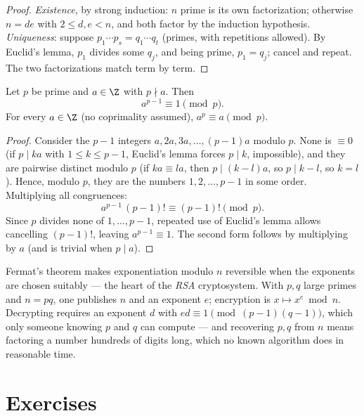 \begin{proof}
\emph{Existence}, by strong induction: $n$ prime is its own factorization;
otherwise $n = de$ with $2 \leq d, e < n$, and both factor by the induction
hypothesis. \emph{Uniqueness}: suppose
$p_1\cdots p_s = q_1 \cdots q_t$ (primes, with repetitions allowed). By
Euclid's lemma, $p_1$ divides some $q_j$, and being prime, $p_1 = q_j$;
cancel and repeat. The two factorizations match term by term.
\end{proof}

\begin{theorem}\label{thm:tle:arith:fermat}
Let $p$ be prime and $a \in \Z$ with $p \nmid a$. Then
\[
a^{p-1} \equiv 1 \pmod p .
\]
For every $a \in \Z$ (no coprimality assumed), $a^p \equiv a \pmod p$.
\end{theorem}

\begin{proof}
Consider the $p - 1$ integers $a, 2a, 3a, \dots, (p-1)a$ modulo $p$. None
is $\equiv 0$ (if $p \mid ka$ with $1 \leq k \leq p-1$, Euclid's lemma forces
$p \mid k$, impossible), and they are pairwise distinct modulo $p$ (if
$ka \equiv la$, then $p \mid (k - l)a$, so $p \mid k - l$, so $k = l$).
Hence, modulo $p$, they are the numbers $1, 2, \dots, p-1$ in some order.
Multiplying all congruences:
\[
a^{p-1}\,(p-1)! \equiv (p-1)! \pmod p .
\]
Since $p$ divides none of $1, \dots, p-1$, repeated use of Euclid's lemma
allows cancelling $(p-1)!$, leaving $a^{p-1} \equiv 1$. The second form
follows by multiplying by $a$ (and is trivial when $p \mid a$).
\end{proof}

\begin{example}\label{ex:tle:arith:rsa}
Fermat's theorem makes exponentiation modulo $n$ reversible when the
exponents are chosen suitably --- the heart of the \emph{RSA} cryptosystem.
With $p, q$ large primes and $n = pq$, one publishes $n$ and an exponent
$e$; encryption is $x \mapsto x^e \bmod n$. Decrypting requires an exponent
$d$ with $ed \equiv 1 \pmod{(p-1)(q-1)}$, which only someone knowing $p$
and $q$ can compute --- and recovering $p, q$ from $n$ means factoring a
number hundreds of digits long, which no known algorithm does in reasonable
time.
\end{example}

\section{Exercises}

